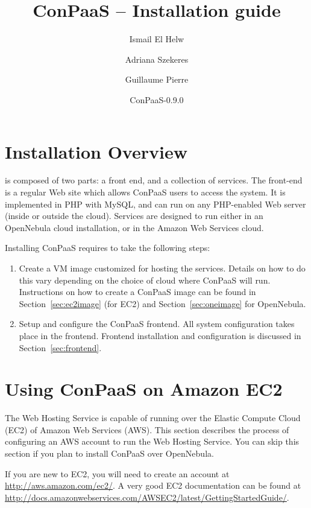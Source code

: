 \documentclass[10pt]{article}
\title{ConPaaS -- Installation guide\htmlonly{ [\xml{a href="installation.pdf"}pdf\xml{/a}]}}
\author{Ismail El Helw \and Adriana Szekeres \and Guillaume Pierre}
\date{ConPaaS-0.9.0}
\begin{document}
\maketitle

\T\vfil
\T\tableofcontents
\T\vfil
\T\newpage

\section{Installation Overview}
\label{sec:overview}

 is composed of two parts: a
front end, and a collection of services. The front-end is a regular
Web site which allows ConPaaS users to access the system. It is
implemented in PHP with MySQL, and can run on any PHP-enabled Web
server (inside or outside the cloud).  Services are designed to run
either in an OpenNebula cloud installation, or in the Amazon Web
Services cloud.

Installing ConPaaS requires to take the following steps:

\begin{enumerate}
\item Create a VM image customized for hosting the services. Details
  on how to do this vary depending on the choice of cloud where
  ConPaaS will run. Instructions on how to create a ConPaaS image can
  be found in Section~\ref{sec:ec2image} (for EC2) and
  Section~\ref{sec:oneimage} for OpenNebula.
\item Setup and configure the ConPaaS frontend. All system
  configuration takes place in the frontend. Frontend installation and
  configuration is discussed in Section~\ref{sec:frontend}.
\end{enumerate}

\section{Using ConPaaS on Amazon EC2}

The Web Hosting Service is capable of running over the Elastic Compute
Cloud (EC2) of Amazon Web Services (AWS). This section describes the
process of configuring an AWS account to run the Web Hosting Service.
You can skip this section if you plan to install ConPaaS over
OpenNebula.

If you are new to EC2, you will need to create an account at
\url{http://aws.amazon.com/ec2/}. A very good EC2 documentation can be
found at
\url{http://docs.amazonwebservices.com/AWSEC2/latest/GettingStartedGuide/}.
\end{document}
